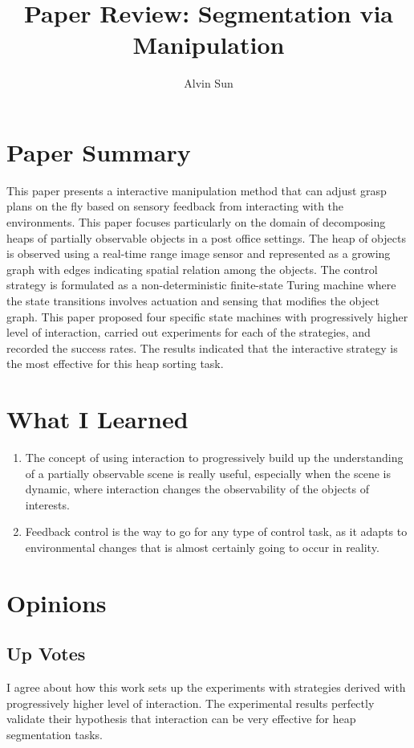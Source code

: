 \documentclass[10pt, twocolumn]{article}
\title{\vspace{-3.0em}Paper Review: Segmentation via Manipulation}
\author{Alvin Sun}
\begin{document}
\maketitle

\section{Paper Summary}
This paper presents a interactive manipulation method that can adjust
grasp plans on the fly based on sensory feedback from interacting with
the environments. This paper focuses particularly on the domain of decomposing
heaps of partially observable objects in a post office settings. The heap of
objects is observed using a real-time range image sensor and represented
as a growing graph with edges indicating spatial relation among the objects.
The control strategy is formulated as a non-deterministic finite-state
Turing machine where the state transitions involves actuation and sensing
that modifies the object graph.
This paper proposed four specific state machines with progressively higher
level of interaction, carried out experiments
for each of the strategies, and recorded the success rates. The results indicated
that the interactive strategy is the most effective for this heap sorting task.

\section{What I Learned}
\begin{enumerate}
  \item The concept of using interaction to progressively build up the understanding
    of a partially observable scene is really useful, especially when the scene
    is dynamic, where interaction changes the observability of the objects of interests.

  \item Feedback control is the way to go for any type of control task, as it
    adapts to environmental changes that is almost certainly going to occur in
    reality.
\end{enumerate}

\section{Opinions}

\subsection{Up Votes}
I agree about how this work sets up the experiments with strategies derived
with progressively higher level of interaction. The experimental results perfectly
validate their hypothesis that interaction can be very effective for heap segmentation
tasks.
\end{document}
